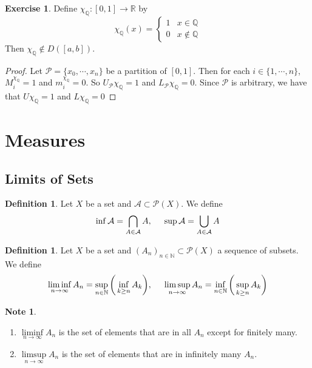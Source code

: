 \documentclass[12pt]{amsart}
\theoremstyle{definition}
\newtheorem{defn}[definition]{Definition}
\newtheorem{note}[definition]{Note}
\newtheorem{ex}[definition]{Exercise}
\newcommand{\N}{\mathbb{N}}
\newcommand{\R}{\mathbb{R}}
\newcommand{\Q}{\mathbb{Q}}
\newcommand{\MA}{\mathcal{A}}
\newcommand{\MP}{\mathcal{P}}
\newcommand{\lex}[1]{\label{ex:#1}}
\newcommand{\ld}[1]{\label{defn:#1}}
\begin{document}
	\begin{ex} \lex{00000} 
		Define $\chi_{\Q}:[0,1] \rightarrow \R$ by $$\chi_{\Q}(x) = \begin{cases}
			1 & x \in \Q \\
			0 & x \not \in \Q
		\end{cases}$$
		Then $\chi_\Q \not \in D([a,b])$.
	\end{ex}

	\begin{proof}
		Let $\MP = \{x_0, \cdots, x_n\}$ be a partition of $[0,1]$. Then for each $i \in \{1, \cdots, n\}$, $M^{\chi_{\Q}}_i = 1$ and $m^{\chi_{\Q}}_i = 0$. So $U_\MP \chi_\Q = 1$ and $L_\MP \chi_\Q = 0$. Since $\MP$ is arbitrary, we have that $U \chi_\Q = 1$ and $L \chi_\Q = 0$
	\end{proof}

	
	
	
	
	
	
	
	
	
	
	
	
	
	
	\newpage
	
	\section{Measures}
	
	\subsection{Limits of Sets}
	
	\begin{defn} \ld{00000} 
		Let $X$ be a set and $\MA \subset \MP(X)$. We define $$\inf \MA = \bigcap_{A \in \MA } A ,\hspace{.5cm} \sup \MA = \bigcup_{A \in \MA} A$$
		
	\end{defn}
	
	\begin{defn} \ld{00000} 
		Let $X$ be a set and $(A_n)_{n \in \N} \subset \MP(X)$ a sequence of subsets. We define
		$$\liminf_{n \rightarrow \infty} A_n = \sup_{n \in \N} \bigg( \inf_{k \geq n}A_k \bigg), \hspace{.5cm } \limsup_{n \rightarrow \infty} A_n = \inf_{n \in \N} \bigg(\sup_{k \geq n}A_k \bigg)$$
	\end{defn}
	
	\begin{note}\
		\begin{enumerate}
			\item $\liminf\limits_{n \rightarrow \infty} A_n$ is the set of elements that are in all $A_n$ except for finitely many. 
			
			\item $\limsup\limits_{n \rightarrow \infty} A_n$ is the set of elements that are in infinitely many $A_n$.
		\end{enumerate}
	\end{note}
	
\end{document}
